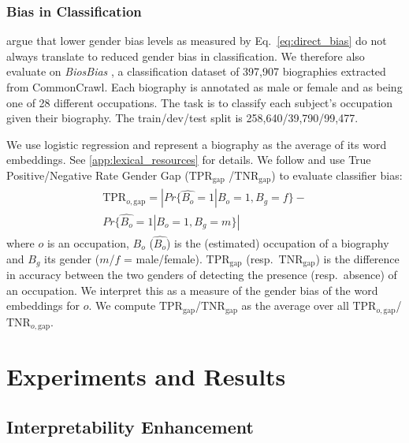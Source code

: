 \documentclass[11pt,a4paper]{article}
\begin{document}
\subsubsection{Bias in Classification}

\citet{prost19biasTextClassif} argue that lower gender bias
levels as measured by Eq.\ \eqref{eq:direct_bias} do not
always translate to reduced gender bias in
classification. We therefore also evaluate on
\textit{BiosBias} \citep{de19biosbias}, a classification
dataset of 397,907 biographies extracted from CommonCrawl.
Each biography is annotated as male or female and as being
one of 28 different occupations. The task is to
classify each subject's occupation given their biography.
The train/dev/test split is 258,640/39,790/99,477.



We use logistic regression and
represent a biography as the average of its word
embeddings. See \ref{app:lexical_resources} for details.
We follow \citet{hardt16equality} and use
True Positive/Negative
Rate Gender Gap ($\text{TPR}_{\text{gap}}$
/$\text{TNR}_{\text{gap}}$) to evaluate classifier bias:
\begin{align}
\begin{split}
    \label{eq:TPR}
\text{TPR}_{o,\text{gap}} \!=\!     |Pr\{\hat{B_o}\!=\!1|B_o\!=\!1,B_g\!=\!f\} -\\ Pr\{\hat{B_o}\!=\!1|B_o\!=\!1,B_g\!=\!m\}|
\end{split}
\end{align}
where $o$ is an occupation,
$B_o$ ($\hat{B_o}$) is the (estimated) occupation of a
biography and $B_g$ its gender ($m$/$f$ = male/female).
$\text{TPR}_{\text{gap}}$
(resp.\ $\text{TNR}_{\text{gap}}$)
is the
difference in accuracy between the two genders of
detecting the presence (resp.\ absence) of an occupation.
We interpret this as a measure of the gender bias of the
word embeddings for $o$.
  We compute
  $\text{TPR}_{\text{gap}}$/$\text{TNR}_{\text{gap}}$ as the average over all
  $\text{TPR}_{o,\text{gap}}$/$\text{TNR}_{o,\text{gap}}$.

\section{Experiments and Results} \label{sec:results}

\subsection{Interpretability Enhancement}
\end{document}

